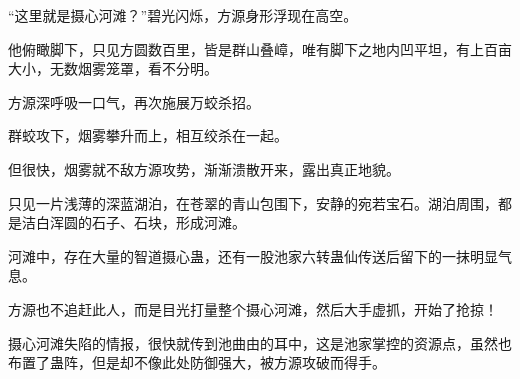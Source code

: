 \begin{this_body}
“这里就是摄心河滩？”碧光闪烁，方源身形浮现在高空。

他俯瞰脚下，只见方圆数百里，皆是群山叠嶂，唯有脚下之地内凹平坦，有上百亩大小，无数烟雾笼罩，看不分明。

方源深呼吸一口气，再次施展万蛟杀招。

群蛟攻下，烟雾攀升而上，相互绞杀在一起。

但很快，烟雾就不敌方源攻势，渐渐溃散开来，露出真正地貌。

只见一片浅薄的深蓝湖泊，在苍翠的青山包围下，安静的宛若宝石。湖泊周围，都是洁白浑圆的石子、石块，形成河滩。

河滩中，存在大量的智道摄心蛊，还有一股池家六转蛊仙传送后留下的一抹明显气息。

方源也不追赶此人，而是目光打量整个摄心河滩，然后大手虚抓，开始了抢掠！

摄心河滩失陷的情报，很快就传到池曲由的耳中，这是池家掌控的资源点，虽然也布置了蛊阵，但是却不像此处防御强大，被方源攻破而得手。

\end{this_body}

